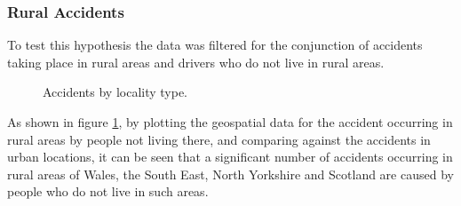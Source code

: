 \documentclass[12pt]{article}
\begin{document}
\subsubsection{Rural Accidents}

To test this hypothesis the data was filtered for the conjunction of accidents taking place in rural areas and drivers who do not live in rural areas. 



\begin{figure}[h]
\centering     %
{}
\caption{Accidents by locality type.}
\label{accidents-locality}
\end{figure}

As shown in figure \ref{accidents-locality}, by plotting the geospatial data for the accident occurring in rural areas by people not living there, and comparing against the accidents in urban locations, it can be seen that a significant number of accidents occurring in rural areas of Wales, the South East, North Yorkshire and Scotland are caused by people who do not live in such areas.

\newpage
\end{document}
